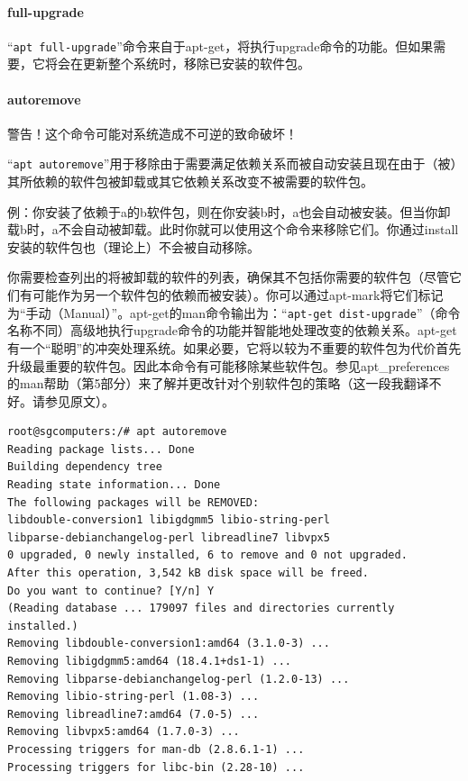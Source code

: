 \paragraph{full-upgrade}
“\verb|apt full-upgrade|”命令来自于apt-get，将执行upgrade命令的功能。但如果需要，它将会在更新整个系统时，移除已安装的软件包。 \par
\paragraph{autoremove}
{\color{red}警告！这个命令可能对系统造成不可逆的致命破坏！}  \par
“\verb|apt autoremove|”用于移除由于需要满足依赖关系而被自动安装且现在由于（被）其所依赖的软件包被卸载或其它依赖关系改变不被需要的软件包。 \par
例：你安装了依赖于a的b软件包，则在你安装b时，a也会自动被安装。但当你卸载b时，a不会自动被卸载。此时你就可以使用这个命令来移除它们。你通过install安装的软件包也（理论上）不会被自动移除。 \par
{\color{red}你需要检查列出的将被卸载的软件的列表，确保其不包括你需要的软件包（尽管它们有可能作为另一个软件包的依赖而被安装）。你可以通过apt-mark将它们标记为“手动（Manual）”}。apt-get的man命令输出为：“\verb|apt-get dist-upgrade|”（命令名称不同）高级地执行upgrade命令的功能并智能地处理改变的依赖关系。apt-get有一个“聪明”的冲突处理系统。如果必要，它将以较为不重要的软件包为代价首先升级最重要的软件包。因此本命令有可能移除某些软件包。参见apt\_preferences的man帮助（第5部分）来了解并更改针对个别软件包的策略（这一段我翻译不好。请参见原文）。\par
\begin{verbatim}
root@sgcomputers:/# apt autoremove
Reading package lists... Done
Building dependency tree
Reading state information... Done
The following packages will be REMOVED:
libdouble-conversion1 libigdgmm5 libio-string-perl
libparse-debianchangelog-perl libreadline7 libvpx5
0 upgraded, 0 newly installed, 6 to remove and 0 not upgraded.
After this operation, 3,542 kB disk space will be freed.
Do you want to continue? [Y/n] Y
(Reading database ... 179097 files and directories currently installed.)
Removing libdouble-conversion1:amd64 (3.1.0-3) ...
Removing libigdgmm5:amd64 (18.4.1+ds1-1) ...
Removing libparse-debianchangelog-perl (1.2.0-13) ...
Removing libio-string-perl (1.08-3) ...
Removing libreadline7:amd64 (7.0-5) ...
Removing libvpx5:amd64 (1.7.0-3) ...
Processing triggers for man-db (2.8.6.1-1) ...
Processing triggers for libc-bin (2.28-10) ...
\end{verbatim}
